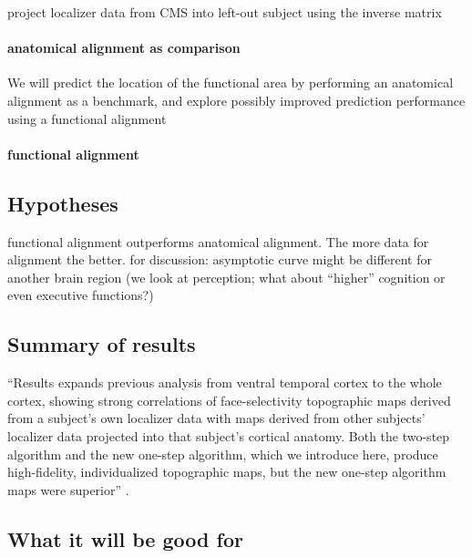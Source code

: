 %
project localizer data from CMS into left-out subject using the inverse matrix


\paragraph{anatomical alignment as comparison}

We will predict the location of the functional area by performing an
anatomical alignment as a benchmark, and explore possibly improved prediction
performance using a functional alignment



\paragraph{functional alignment}



\subsection{Hypotheses}
%
functional alignment outperforms anatomical alignment.
%
The more data for alignment the better.
%
for discussion: asymptotic curve might be different for another brain region
(we look at perception; what about ``higher'' cognition or even executive
functions?)

\subsection{Summary of results}

%
``Results expands previous analysis from ventral temporal cortex to the whole
cortex, showing strong correlations of face-selectivity topographic maps derived
from a subject's own localizer data with maps derived from other subjects'
localizer data projected into that subject's cortical anatomy. Both the two-step
algorithm and the new one-step algorithm, which we introduce here, produce
high-fidelity, individualized topographic maps, but the new one-step algorithm
maps were superior'' \citep{jiahui2020predicting}.


\subsection{What it will be good for}

